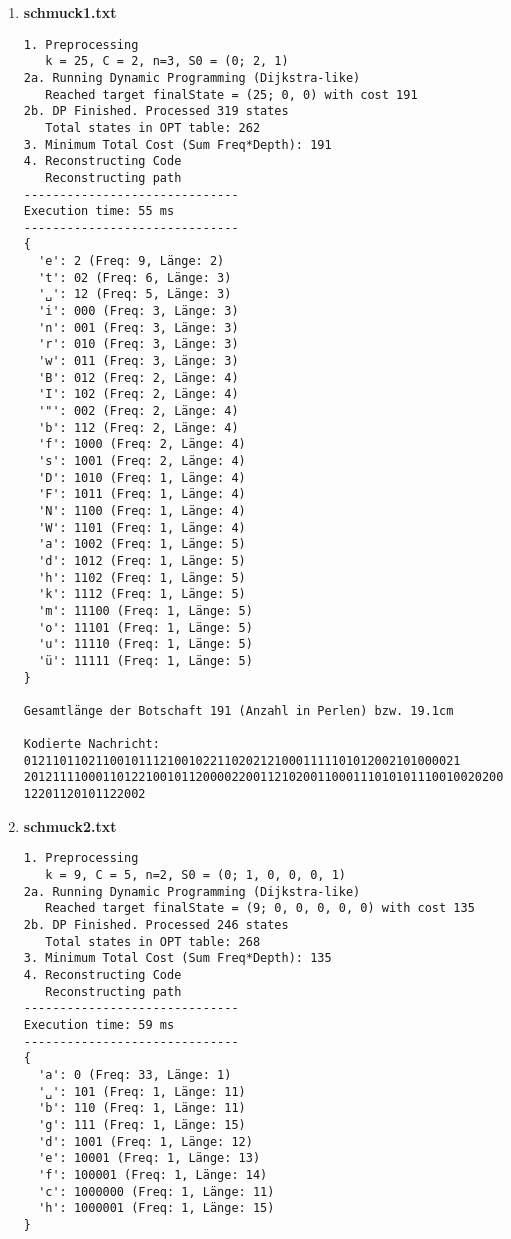 \documentclass[a4paper,10pt,ngerman]{scrartcl}
\begin{document}
\begin{enumerate}
  \item \textbf{schmuck1.txt}
  \begin{verbatim}
1. Preprocessing
   k = 25, C = 2, n=3, S0 = (0; 2, 1)
2a. Running Dynamic Programming (Dijkstra-like)
   Reached target finalState = (25; 0, 0) with cost 191
2b. DP Finished. Processed 319 states
   Total states in OPT table: 262
3. Minimum Total Cost (Sum Freq*Depth): 191
4. Reconstructing Code
   Reconstructing path
------------------------------
Execution time: 55 ms
------------------------------
{
  'e': 2 (Freq: 9, Länge: 2)
  't': 02 (Freq: 6, Länge: 3)
  '␣': 12 (Freq: 5, Länge: 3)
  'i': 000 (Freq: 3, Länge: 3)
  'n': 001 (Freq: 3, Länge: 3)
  'r': 010 (Freq: 3, Länge: 3)
  'w': 011 (Freq: 3, Länge: 3)
  'B': 012 (Freq: 2, Länge: 4)
  'I': 102 (Freq: 2, Länge: 4)
  '"': 002 (Freq: 2, Länge: 4)
  'b': 112 (Freq: 2, Länge: 4)
  'f': 1000 (Freq: 2, Länge: 4)
  's': 1001 (Freq: 2, Länge: 4)
  'D': 1010 (Freq: 1, Länge: 4)
  'F': 1011 (Freq: 1, Länge: 4)
  'N': 1100 (Freq: 1, Länge: 4)
  'W': 1101 (Freq: 1, Länge: 4)
  'a': 1002 (Freq: 1, Länge: 5)
  'd': 1012 (Freq: 1, Länge: 5)
  'h': 1102 (Freq: 1, Länge: 5)
  'k': 1112 (Freq: 1, Länge: 5)
  'm': 11100 (Freq: 1, Länge: 5)
  'o': 11101 (Freq: 1, Länge: 5)
  'u': 11110 (Freq: 1, Länge: 5)
  'ü': 11111 (Freq: 1, Länge: 5)
}

Gesamtlänge der Botschaft 191 (Anzahl in Perlen) bzw. 19.1cm

Kodierte Nachricht: 0121101102110010111210010221102021210001111101012002101000021
201211110001101221001011200002200112102001100011101010111001002020001112011202021
12201120101122002
  \end{verbatim}
  \item \textbf{schmuck2.txt}
  \begin{verbatim}
1. Preprocessing
   k = 9, C = 5, n=2, S0 = (0; 1, 0, 0, 0, 1)
2a. Running Dynamic Programming (Dijkstra-like)
   Reached target finalState = (9; 0, 0, 0, 0, 0) with cost 135
2b. DP Finished. Processed 246 states
   Total states in OPT table: 268
3. Minimum Total Cost (Sum Freq*Depth): 135
4. Reconstructing Code
   Reconstructing path
------------------------------
Execution time: 59 ms
------------------------------
{
  'a': 0 (Freq: 33, Länge: 1)
  '␣': 101 (Freq: 1, Länge: 11)
  'b': 110 (Freq: 1, Länge: 11)
  'g': 111 (Freq: 1, Länge: 15)
  'd': 1001 (Freq: 1, Länge: 12)
  'e': 10001 (Freq: 1, Länge: 13)
  'f': 100001 (Freq: 1, Länge: 14)
  'c': 1000000 (Freq: 1, Länge: 11)
  'h': 1000001 (Freq: 1, Länge: 15)
}


\end{verbatim}
\end{enumerate}
\end{document}
